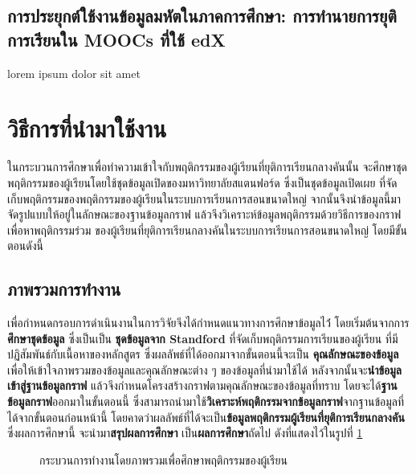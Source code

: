 \documentclass[conference]{IEEEtran}
\def\moocs{การเรียนการสอนขนาดใหญ่}
\def\MOOCs{ระบบ{\moocs}}
\def\dropout{ยุติการเรียนกลางคัน}
\begin{document}
    \subsection{การประยุกต์ใช้งานข้อมูลมหัตในภาคการศึกษา: การทำนายการยุติการเรียนใน MOOCs ที่ใช้ edX \cite{paper:7545065}}
    lorem ipsum dolor sit amet

    \section[technicalbackground]{วิธีการที่นำมาใช้งาน}

    ในกระบวนการศึกษาเพื่อทำความเข้าใจกับพฤติกรรมของผู้เรียนที่{\dropout}นั้น
    จะศึกษาชุดพฤติกรรมของผู้เรียนโดยใช้ชุดข้อมูลเปิดของมหาวิทยาลัยสแตนฟอร์ด 
    ซึ่งเป็นชุดข้อมูลเปิดเผย ที่จัดเก็บพฤติกรรมของพฤติกรรมของผู้เรียนใน{\MOOCs}
    จากนั้นจึงนำข้อมูลนี้มาจัดรูปแบบให้อยู่ในลักษณะของฐานข้อมูลกราฟ 
    แล้วจึงวิเคราะห์ข้อมูลพฤติกรรมด้วยวิธีการของกราฟเพื่อหาพฤติกรรมร่วม
    ของผู้เรียนที่{\dropout}ใน{\MOOCs} โดยมีขั้นตอนดังนี้

    \subsection[overview step]{ภาพรวมการทำงาน}

    เพื่อกำหนดกรอบการดำเนินงานในการวิจัยจึงได้กำหนดแนวทางการศึกษาข้อมูลไว้่
    โดยเริ่มต้นจากการ \textbf{ศึกษาชุดข้อมูล} ซึ่งเป็นเป็น \textbf{ชุดข้อมูลจาก Standford} 
    ที่จัดเก็บพฤติกรรมการเรียนของผู้เรียน ที่มีปฏิสัมพันธ์กับเนื้อหาของหลักสูตร 
    ซึ่งผลลัพธ์ที่ได้ออกมาจากขั้นตอนนี้จะเป็น \textbf{คุณลักษณะของข้อมูล} 
    เพื่อให้เข้าใจภาพรวมของข้อมูลและคุณลักษณะต่าง ๆ ของข้อมูลที่นำมาใช้ได้ 
    หลังจากนั้นจะ\textbf{นำข้อมูลเข้าสู่ฐานข้อมูลกราฟ}
    แล้วจึงกำหนดโครงสร้างกราฟตามคุณลักษณะของข้อมูลที่ทราบ 
    โดยจะได้\textbf{ฐานข้อมูลกราฟ}ออกมาในขั้นตอนนี้ 
    ซึ่งสามารถนำมาใช้\textbf{วิเคราะห์พฤติกรรมจากข้อมูลกราฟ}จากฐานข้อมูลที่ได้จากขั้นตอนก่อนหน้านี้
    โดยคาดว่าผลลัพธ์ที่ได้จะเป็น\textbf{ข้อมูลพฤติกรรมผู้เรียนที่{\dropout}} 
    ซึ่งผลการศึกษานี้ จะนำมา\textbf{สรุปผลการศึกษา} เป็น\textbf{ผลการศึกษา}ถัดไป
    ดังที่แสดงไว้ในรูปที่ \ref{fig:overview-process}
    \begin{figure}[htbp]
        \caption{กระบวนการทำงานโดยภาพรวมเพื่อศึกษาพฤติกรรมของผู้เรียน}
        \label{fig:overview-process}
    \end{figure}
\end{document}
